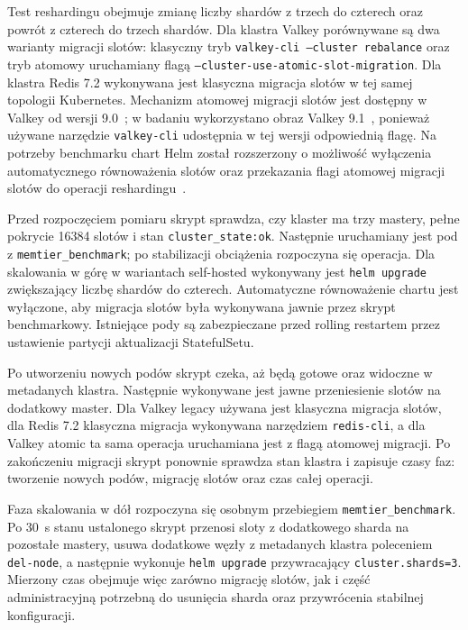 Test reshardingu obejmuje zmianę liczby shardów z trzech do czterech oraz powrót z czterech do trzech shardów. Dla klastra Valkey porównywane są dwa warianty migracji slotów: klasyczny tryb \texttt{valkey-cli --cluster rebalance} oraz tryb atomowy uruchamiany flagą \texttt{--cluster-use-atomic-slot-migration}. Dla klastra Redis 7.2 wykonywana jest klasyczna migracja slotów w tej samej topologii Kubernetes. Mechanizm atomowej migracji slotów jest dostępny w Valkey od wersji 9.0~\cite{valkey90release}; w badaniu wykorzystano obraz Valkey 9.1~\cite{valkey91release}, ponieważ używane narzędzie \texttt{valkey-cli} udostępnia w tej wersji odpowiednią flagę. Na potrzeby benchmarku chart Helm został rozszerzony o możliwość wyłączenia automatycznego równoważenia slotów oraz przekazania flagi atomowej migracji slotów do operacji reshardingu~\cite{valkeyHelmPr116}.

Przed rozpoczęciem pomiaru skrypt sprawdza, czy klaster ma trzy mastery, pełne pokrycie 16384 slotów i stan \texttt{cluster\_state:ok}. Następnie uruchamiany jest pod z \texttt{memtier\_benchmark}; po stabilizacji obciążenia rozpoczyna się operacja. Dla skalowania w górę w wariantach self-hosted wykonywany jest \texttt{helm upgrade} zwiększający liczbę shardów do czterech. Automatyczne równoważenie chartu jest wyłączone, aby migracja slotów była wykonywana jawnie przez skrypt benchmarkowy. Istniejące pody są zabezpieczane przed rolling restartem przez ustawienie partycji aktualizacji StatefulSetu.

Po utworzeniu nowych podów skrypt czeka, aż będą gotowe oraz widoczne w metadanych klastra. Następnie wykonywane jest jawne przeniesienie slotów na dodatkowy master. Dla Valkey legacy używana jest klasyczna migracja slotów, dla Redis 7.2 klasyczna migracja wykonywana narzędziem \texttt{redis-cli}, a dla Valkey atomic ta sama operacja uruchamiana jest z flagą atomowej migracji. Po zakończeniu migracji skrypt ponownie sprawdza stan klastra i zapisuje czasy faz: tworzenie nowych podów, migrację slotów oraz czas całej operacji.

Faza skalowania w dół rozpoczyna się osobnym przebiegiem \texttt{memtier\_benchmark}. Po 30~s stanu ustalonego skrypt przenosi sloty z dodatkowego sharda na pozostałe mastery, usuwa dodatkowe węzły z metadanych klastra poleceniem \texttt{del-node}, a następnie wykonuje \texttt{helm upgrade} przywracający \texttt{cluster.shards=3}. Mierzony czas obejmuje więc zarówno migrację slotów, jak i część administracyjną potrzebną do usunięcia sharda oraz przywrócenia stabilnej konfiguracji.

